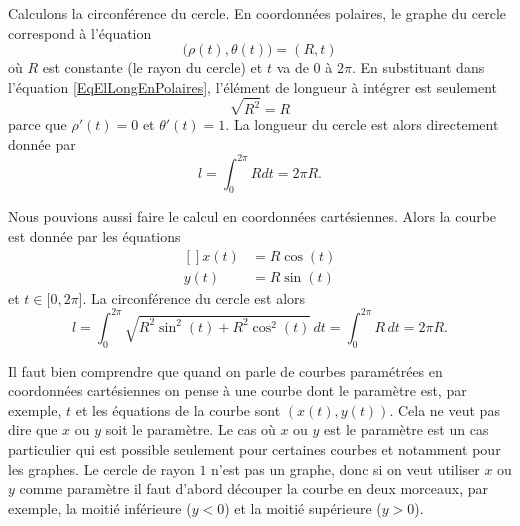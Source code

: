 \begin{example}     \label{ExempleLongCercle}
	Calculons la circonférence du cercle. En coordonnées polaires, le graphe du cercle correspond à l'équation
	\begin{equation}
		\big( \rho(t),\theta(t) \big)=(R,t)
	\end{equation}
	où \( R\) est constante (le rayon du cercle) et \( t\) va de \( 0\) à \( 2\pi\). En substituant dans l'équation \eqref{EqElLongEnPolaires}, l'élément de longueur à intégrer est seulement
	\begin{equation}
		\sqrt{R^2}=R
	\end{equation}
	parce que \( \rho'(t)=0\) et \( \theta'(t)=1\). La longueur du cercle est alors directement donnée par
	\begin{equation}
		l=\int_0^{2\pi}Rdt=2\pi R.
	\end{equation}

	Nous pouvions aussi faire le calcul en coordonnées cartésiennes. Alors la courbe est donnée par les équations
	\begin{equation}
		\begin{aligned}[]
			x(t) & =R\cos(t) \\
			y(t) & =R\sin(t)
		\end{aligned}
	\end{equation}
	et \( t\in\mathopen[ 0 , 2\pi \mathclose]\). La circonférence du cercle est alors
	\begin{equation}
		l=\int_0^{2\pi}\sqrt{R^2\sin^2(t)+R^2\cos^2(t)}\,dt=\int_0^{2\pi}R\,dt=2\pi R.
	\end{equation}
\end{example}
\begin{remark}
	Il faut bien comprendre que quand on parle de courbes paramétrées en coordonnées cartésiennes on pense à une courbe dont le paramètre est, par exemple, \( t\) et les équations de la courbe sont \( (x(t), y(t))\). Cela ne veut pas dire que \( x\) ou \( y\) soit le paramètre. Le cas où \( x\) ou \( y\) est le paramètre est un cas particulier qui est possible seulement pour certaines courbes et notamment pour les graphes. Le cercle de rayon \( 1\) n'est pas un graphe, donc si on veut utiliser \( x\) ou \( y\) comme paramètre il faut d'abord découper la courbe en deux morceaux, par exemple, la moitié inférieure (\( y<0\)) et la moitié supérieure (\( y>0\)).
\end{remark}
